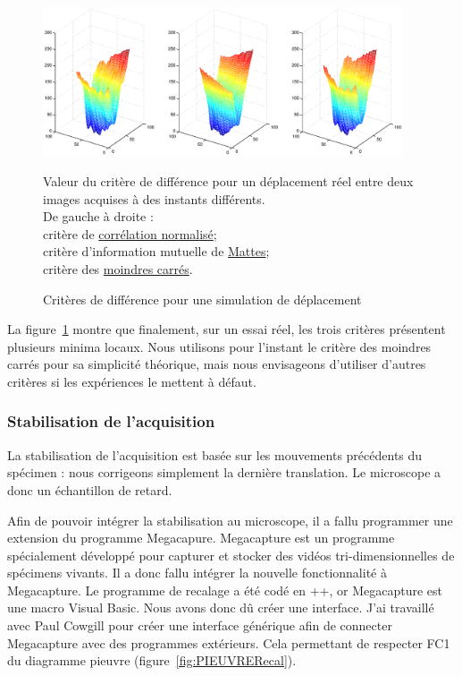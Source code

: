 \begin{figure}[h]
\begin{center}
\leavevmode
\includegraphics[width=0.95\textwidth]{pictures/Recal3DmetricsCMSReal}
\end{center}
\caption{Critères de différence pour une simulation de déplacement}{Valeur du critère de différence pour un déplacement réel entre deux images acquises à des instants différents.\\
De gauche à droite :\\
critère de \href{http://www.itk.org/Doxygen/html/classitk_1_1NormalizedCorrelationImageToImageMetric.html}{corrélation normalisé};\\
critère d'information mutuelle de \href{http://www.itk.org/Doxygen/html/classitk_1_1MattesMutualInformationImageToImageMetric.html}{Mattes};\\
critère des \href{http://www.itk.org/Doxygen/html/classitk_1_1MeanSquaresImageToImageMetric.html}{moindres carrés}. }
\label{fig:RecalMetricReal}
\end{figure}


La figure~\ref{fig:RecalMetricReal} montre que finalement, sur un essai réel, les trois critères présentent plusieurs minima locaux.
Nous utilisons pour l'instant le critère des moindres carrés pour sa simplicité théorique, mais nous envisageons d'utiliser d'autres critères si les expériences le mettent à défaut.


\subsubsection{Stabilisation de l'acquisition}

La stabilisation de l'acquisition est basée sur les mouvements précédents du spécimen :
nous corrigeons simplement la dernière translation. Le microscope a donc un échantillon de retard.

Afin de pouvoir intégrer la stabilisation au microscope, il a fallu programmer une extension du programme Megacapure.
Megacapture est un programme spécialement développé pour capturer et stocker
des vidéos tri-dimensionnelles de spécimens vivants.
Il a donc fallu intégrer la nouvelle fonctionnalité à Megacapture. Le programme de recalage a été codé en {\C++},
or Megacapture est une macro Visual Basic. Nous avons donc dû créer une interface.
J'ai travaillé avec Paul Cowgill pour créer une interface générique afin de connecter
Megacapture avec des programmes extérieurs. Cela permettant de respecter FC1 du diagramme pieuvre
(figure~\ref{fig:PIEUVRERecal}).

